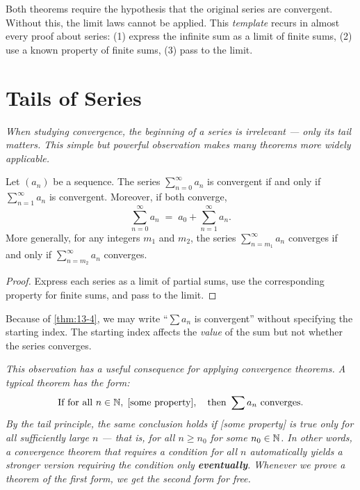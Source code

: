 \begin{remark}
Both theorems require the hypothesis that the original series are convergent.  Without this, the limit laws cannot be applied.  This \emph{template} recurs in almost every proof about series: (1) express the infinite sum as a limit of finite sums, (2) use a known property of finite sums, (3) pass to the limit.
\end{remark}

\section{Tails of Series}
\label{sec:13.7}

\textit{When studying convergence, the beginning of a series is irrelevant --- only its tail matters.  This simple but powerful observation makes many theorems more widely applicable.}

\begin{theorem}
\label{thm:13-4}
Let $(a_{n})$ be a sequence.  The series $\sum_{n=0}^{\infty}a_{n}$ is convergent if and only if $\sum_{n=1}^{\infty}a_{n}$ is convergent.  Moreover, if both converge,
\[
  \sum_{n=0}^{\infty}a_{n} \;=\; a_{0} + \sum_{n=1}^{\infty}a_{n}.
\]
More generally, for any integers $m_{1}$ and $m_{2}$, the series $\sum_{n=m_{1}}^{\infty}a_{n}$ converges if and only if $\sum_{n=m_{2}}^{\infty}a_{n}$ converges.
\end{theorem}

\begin{proof}
Express each series as a limit of partial sums, use the corresponding property for finite sums, and pass to the limit.
\end{proof}

\begin{remark}
Because of \cref{thm:13-4}, we may write ``$\sum a_{n}$ is convergent'' without specifying the starting index.  The starting index affects the \emph{value} of the sum but not whether the series converges.
\end{remark}

\textit{This observation has a useful consequence for applying convergence theorems.  A typical theorem has the form:}
\[
  \text{If for all } n\in\mathbb{N},\;\text{[some property]},\quad\text{then } \sum a_{n} \text{ converges.}
\]
\textit{By the tail principle, the same conclusion holds if [some property] is true only for all sufficiently large $n$ --- that is, for all $n\ge n_{0}$ for some $n_{0}\in\mathbb{N}$.  In other words, a convergence theorem that requires a condition for all $n$ automatically yields a stronger version requiring the condition only \textbf{eventually}.  Whenever we prove a theorem of the first form, we get the second form for free.}

